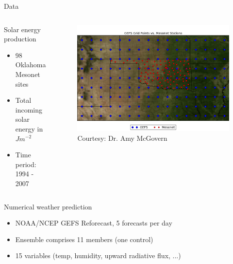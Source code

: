 \documentclass[handout]{beamer}
\begin{document}
\begin{frame}{Data}

\begin{columns}[T]
    \begin{column}{.45\textwidth}

\begin{block}{Solar energy production}
  \begin{itemize}
     \item 98 Oklahoma Mesonet sites
     \item Total incoming solar energy in $J m^{-2}$
     \item Time period: 1994 - 2007
  \end{itemize}
\end{block}

    \end{column}
    \begin{column}{.45\textwidth}

  \begin{figure}
    \includegraphics[width=\textwidth]{images/gefs_mesonet_stations.png}\\
    {\color{gray}\tiny{Courtesy: Dr. Amy McGovern}}
  \end{figure}

    \end{column}
  \end{columns}

\begin{block}{Numerical weather prediction}
\begin{itemize}
     \item NOAA/NCEP GEFS Reforecast, 5 forecasts per day
     \item Ensemble comprises 11 members (one control)
     \item 15 variables (temp, humidity, upward radiative flux, ...)
  \end{itemize}
\end{block}

\end{frame}
\end{document}
